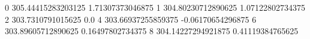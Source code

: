 0 305.44415283203125 1.71307373046875
1 304.80230712890625 1.07122802734375
2 303.7310791015625 0.0
4 303.66937255859375 -0.06170654296875
6 303.89605712890625 0.16497802734375
8 304.14227294921875 0.41119384765625
